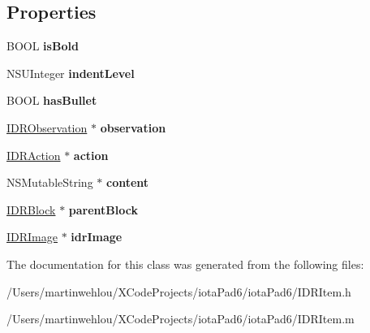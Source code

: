 \subsection*{Properties}
\begin{DoxyCompactItemize}
\item 
\hypertarget{interface_i_d_r_item_a7e8958fa52cd366847c0306a01ee656d}{
BOOL {\bfseries isBold}}
\label{interface_i_d_r_item_a7e8958fa52cd366847c0306a01ee656d}

\item 
\hypertarget{interface_i_d_r_item_a1a42e299503604811ba83073be9672f3}{
NSUInteger {\bfseries indentLevel}}
\label{interface_i_d_r_item_a1a42e299503604811ba83073be9672f3}

\item 
\hypertarget{interface_i_d_r_item_a5fdb792d1a6f9dcc6c0d321a6221ba5d}{
BOOL {\bfseries hasBullet}}
\label{interface_i_d_r_item_a5fdb792d1a6f9dcc6c0d321a6221ba5d}

\item 
\hypertarget{interface_i_d_r_item_a6da1fb45599f09441aeb999dc6f8645d}{
\hyperlink{interface_i_d_r_observation}{IDRObservation} $\ast$ {\bfseries observation}}
\label{interface_i_d_r_item_a6da1fb45599f09441aeb999dc6f8645d}

\item 
\hypertarget{interface_i_d_r_item_af4ad8e11c8557b2591770c51c2606a26}{
\hyperlink{interface_i_d_r_action}{IDRAction} $\ast$ {\bfseries action}}
\label{interface_i_d_r_item_af4ad8e11c8557b2591770c51c2606a26}

\item 
\hypertarget{interface_i_d_r_item_a6079791d156782eeb9f4fb2c58553750}{
NSMutableString $\ast$ {\bfseries content}}
\label{interface_i_d_r_item_a6079791d156782eeb9f4fb2c58553750}

\item 
\hypertarget{interface_i_d_r_item_a84ea3108a1851ddbad590c498b10c937}{
\hyperlink{interface_i_d_r_block}{IDRBlock} $\ast$ {\bfseries parentBlock}}
\label{interface_i_d_r_item_a84ea3108a1851ddbad590c498b10c937}

\item 
\hypertarget{interface_i_d_r_item_a3435fe12c9f1dce4d743fdeae44b9426}{
\hyperlink{interface_i_d_r_image}{IDRImage} $\ast$ {\bfseries idrImage}}
\label{interface_i_d_r_item_a3435fe12c9f1dce4d743fdeae44b9426}

\end{DoxyCompactItemize}


The documentation for this class was generated from the following files:\begin{DoxyCompactItemize}
\item 
/Users/martinwehlou/XCodeProjects/iotaPad6/iotaPad6/IDRItem.h\item 
/Users/martinwehlou/XCodeProjects/iotaPad6/iotaPad6/IDRItem.m\end{DoxyCompactItemize}
